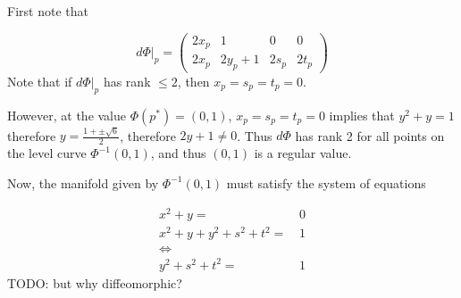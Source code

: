 First note that 

\begin{equation*}
d\Phi|_p = 
\left(
	\begin{matrix}
	2x_p & 1 & 0 & 0
	\\
	2x_p& 2y_p+1 & 2s_p & 2t_p
	\end{matrix}
\right)
\end{equation*}
Note that if $d\Phi|_p$ has rank $\leq 2$, then $x_p = s_p = t_p = 0$.  

However, at the value $\Phi(p^*)=(0,1)$, $x_p = s_p = t_p = 0$ implies that $y^2 + y = 1$ therefore $y=\frac{1 + \pm \sqrt{6}}{2}$, therefore $2y+1 \neq 0$.  Thus $d\Phi$ has rank 2 for all points on the level curve $\Phi^{-1}(0,1)$, and thus $(0,1)$ is a regular value.

Now, the manifold given by $\Phi^{-1}(0,1)$ must satisfy the system of equations 

\begin{align*}
x^2 + y = & \, 0
\\
x^2 + y + y^2 + s^2 + t^2 = & \, 1
\\
\iff
\\
y^2 + s^2 + t^2 = & \, 1
\end{align*}
TODO: but why diffeomorphic?

